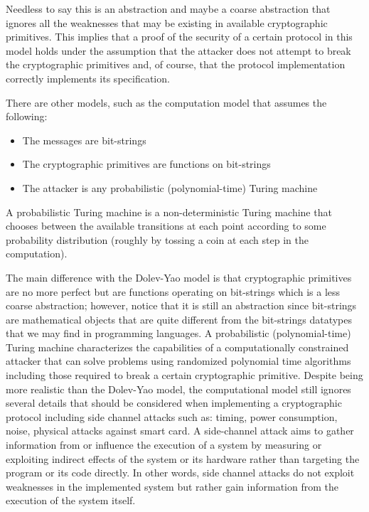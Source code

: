 Needless to say this is an abstraction and maybe a coarse abstraction that ignores all the weaknesses that may be existing in available cryptographic primitives. This implies that a proof of the security of a certain protocol in this model holds under the assumption that the attacker does not attempt to break the cryptographic primitives and, of course, that the protocol implementation correctly implements its specification.


There are other models, such as the computation model that assumes the following:
\begin{itemize}
	\item The messages are bit-strings
	\item The cryptographic primitives are functions on bit-strings
	\item The attacker is any probabilistic (polynomial-time) Turing machine
\end{itemize}

A probabilistic Turing machine is a non-deterministic Turing machine that chooses between the available transitions at each point according to some probability distribution (roughly by tossing a coin at each step in the computation).

The main difference with the Dolev-Yao model is that cryptographic primitives are no more perfect but are functions operating on bit-strings which is a less coarse abstraction; however, notice that it is still an abstraction since bit-strings are mathematical objects that are quite different from the bit-strings datatypes that we may find in programming languages. A probabilistic (polynomial-time) Turing machine characterizes the capabilities of a computationally constrained attacker that can solve problems using randomized polynomial time algorithms including those required to break a certain cryptographic primitive.
Despite being more realistic than the Dolev-Yao model, the computational model still ignores several details that should be considered when implementing a cryptographic protocol including side channel attacks such as: timing, power consumption, noise, physical attacks against smart card.
A side-channel attack aims to gather information from or influence the execution of a system by measuring or exploiting indirect effects of the system or its hardware rather than targeting the program or its code directly. In other words, side channel attacks do not exploit weaknesses in the implemented system but rather gain information from the execution of the system itself.

